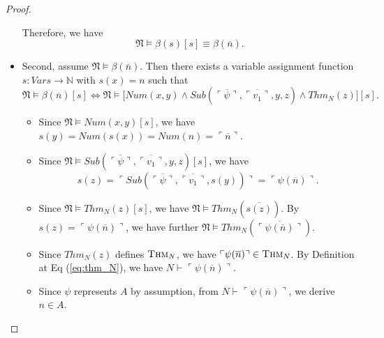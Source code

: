 \documentclass[11pt,letterpaper]{book}
\theoremstyle{definition}
\begin{document}
\begin{proof}
\begin{itemize}
{Therefore, we have
$$ \mathfrak{N} \models \beta(s) [s] \equiv \beta (\overline{n}) .$$
}
\item{Second, assume $\mathfrak{N} \models \beta( \overline{n} )$. Then there exists a variable assignment function $s: Vars \rightarrow \mathbb{N} $ with $s(x) = n$ such that 
$$ \mathfrak{N} \models \beta (\overline{n} )[s] \iff \mathfrak{N} \models  \big[ Num(x, y) \land Sub( \overline{\ulcorner \psi \urcorner}, \overline{\ulcorner v_1 \urcorner}, y, z ) \land Thm_N (z) \big] [s] .$$ 
\begin{itemize}
\item{Since $\mathfrak{N} \models Num(x, y)[s]$, we have $s(y) = Num( s(x) ) = Num(n) = \ulcorner \overline{n} \urcorner$.}
\item{Since $\mathfrak{N} \models Sub( \overline{\ulcorner \psi \urcorner}, \overline{\ulcorner v_1 \urcorner}, y, z )[s]$, we have
$$ s(z) = \ulcorner Sub(\overline{\ulcorner \psi \urcorner}, \overline{\ulcorner v_1 \urcorner}, s(y) )  \urcorner = \ulcorner \psi(\overline{n} ) \urcorner .$$
}
\item{Since $\mathfrak{N} \models Thm_N (z)[s]$, we have $\mathfrak{N} \models Thm_N ( \overline{s(z)} ) $. By $s(z) = \ulcorner \psi(\overline{n} ) \urcorner $, we have further $\mathfrak{N} \models Thm_N ( \overline{ \ulcorner \psi(\overline{n} ) \urcorner } ) $.}
\item{Since $Thm_N (z)$ defines $\text{\textsc{Thm}}_N$, we have $ \ulcorner \psi(\overline{n} ) \urcorner \in \text{\textsc{Thm}}_N $. By Definition at Eq (\ref{eq:thm_N}), we have $N \vdash  \ulcorner \psi(\overline{n} ) \urcorner $. }
\item{Since $\psi$ represents $A$ by assumption, from $N \vdash  \ulcorner \psi(\overline{n} ) \urcorner $, we derive $n \in A$. }
\end{itemize}
}
\end{itemize}

\end{proof}
\end{document}

